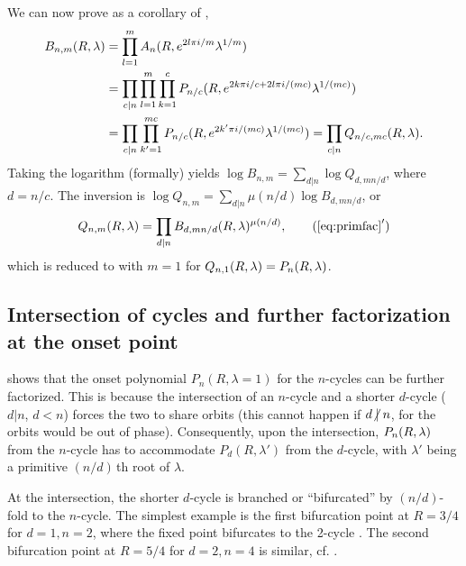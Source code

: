 \documentclass[preprint]{revtex4-1}
\begin{document}
We can now prove  as a corollary of ,
\begin{align*}
 B_{n, m} (R, \lambda)
 & = \prod_{l = 1}^{m} A_n(R, e^{2l\pi i/m} \lambda^{1/m}) \\
 & = \prod_{c | n} \prod_{l=1}^m \prod_{k=1}^c P_{n/c}(R, e^{2k\pi i/c + 2l\pi i/(m c)} \lambda^{1/(m c)}) \\
 & = \prod_{c | n} \prod_{k'=1}^{m c} P_{n/c}(R, e^{2k'\pi i/(m c)} \lambda^{1/(m c)})
  = \prod_{c | n} Q_{n /c, m c}(R, \lambda).
\end{align*}
Taking the logarithm (formally) yields
  $\log B_{n, m} = \sum_{d|n} \log Q_{d, m n/d}$,
where $d = n/c$.
The inversion is
  $\log Q_{n, m} = \sum_{d|n} \mu(n/d) \log B_{d, m n/d}$,
or
\begin{equation}
  Q_{n, m}\RX
= \prod_{d|n} B_{d, m n/d}\RX^{\mu(n/d)},
\tag{$\ref{eq:primfac}'$}
\end{equation}
which is reduced to  with $m = 1$
for $Q_{n, 1}(R, \lambda) = P_n(R, \lambda)$.









\subsection{\label{sec:origfac}Intersection of cycles
  and further factorization at the onset point}


 shows that
the onset polynomial
  $P_n(R, \lambda = 1)$ for the $n$-cycles
  can be further factorized.
%
This is because the intersection of an $n$-cycle
  and a shorter $d$-cycle ($d|n$, $d < n$)
  forces the two to share orbits
  (this cannot happen if $d \centernot| n$,
  for the orbits would be out of phase).
%
Consequently, upon the intersection,
  $P_n(R, \lambda)$ from the $n$-cycle
  has to accommodate $P_d(R, \lambda')$ from the $d$-cycle,
  with $\lambda'$ being a primitive $(n/d)\,$th root of $\lambda$.

At the intersection,
  the shorter $d$-cycle is branched or ``bifurcated''
  by $(n/d)$-fold to the $n$-cycle.
%
The simplest example is the first bifurcation point
  at $R = 3/4$ for $d = 1, n = 2$,
  where the fixed point 
  bifurcates to
  the 2-cycle .
The second bifurcation point at $R=5/4$ for $d = 2, n = 4$ is similar,
  cf. .
\end{document}

